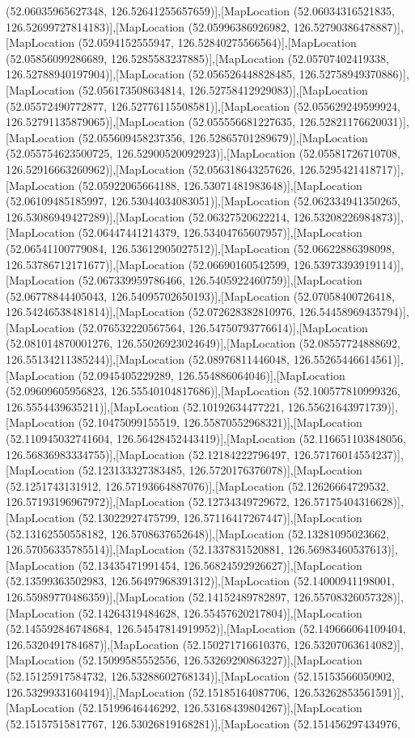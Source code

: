 (52.06035965627348, 126.52641255657659)],[MapLocation (52.06034316521835, 126.52699727814183)],[MapLocation (52.05996386926982, 126.52790386478887)],[MapLocation (52.0594152555947, 126.52840275566564)],[MapLocation (52.05856099286689, 126.5285583237885)],[MapLocation (52.05707402419338, 126.52788940197904)],[MapLocation (52.056526448828485, 126.52758949370886)],[MapLocation (52.056173508634814, 126.52758412929083)],[MapLocation (52.05572490772877, 126.52776115508581)],[MapLocation (52.055629249599924, 126.52791135879065)],[MapLocation (52.055556681227635, 126.52821176620031)],[MapLocation (52.055609458237356, 126.52865701289679)],[MapLocation (52.055754623500725, 126.52900520092923)],[MapLocation (52.05581726710708, 126.52916663260962)],[MapLocation (52.056318643257626, 126.5295421418717)],[MapLocation (52.05922065664188, 126.53071481983648)],[MapLocation (52.06109485185997, 126.53044034083051)],[MapLocation (52.062334941350265, 126.53086949427289)],[MapLocation (52.06327520622214, 126.53208226984873)],[MapLocation (52.06447441214379, 126.53404765607957)],[MapLocation (52.06541100779084, 126.53612905027512)],[MapLocation (52.06622886398098, 126.53786712171677)],[MapLocation (52.06690160542599, 126.53973393919114)],[MapLocation (52.067339959786466, 126.5405922460759)],[MapLocation (52.06778844405043, 126.54095702650193)],[MapLocation (52.07058400726418, 126.54246538481814)],[MapLocation (52.072628382810976, 126.54458969435794)],[MapLocation (52.076532220567564, 126.54750793776614)],[MapLocation (52.081014870001276, 126.55026923024649)],[MapLocation (52.08557724888692, 126.55134211385244)],[MapLocation (52.08976811446048, 126.55265446614561)],[MapLocation (52.0945405229289, 126.554886064046)],[MapLocation (52.09609605956823, 126.55540104817686)],[MapLocation (52.100577810999326, 126.5554439635211)],[MapLocation (52.10192634477221, 126.55621643971739)],[MapLocation (52.10475099155519, 126.55870552968321)],[MapLocation (52.110945032741604, 126.56428452443419)],[MapLocation (52.116651103848056, 126.56836983334755)],[MapLocation (52.12184222796497, 126.57176014554237)],[MapLocation (52.123133327383485, 126.5720176376078)],[MapLocation (52.1251743131912, 126.57193664887076)],[MapLocation (52.12626664729532, 126.57193196967972)],[MapLocation (52.12734349729672, 126.57175404316628)],[MapLocation (52.13022927475799, 126.57116417267447)],[MapLocation (52.13162550558182, 126.5708637652648)],[MapLocation (52.13281095023662, 126.57056335785514)],[MapLocation (52.1337831520881, 126.56983460537613)],[MapLocation (52.13435471991454, 126.56824592926627)],[MapLocation (52.13599363502983, 126.56497968391312)],[MapLocation (52.14000941198001, 126.55989770486359)],[MapLocation (52.14152489782897, 126.55708326057328)],[MapLocation (52.14264319484628, 126.55457620217804)],[MapLocation (52.145592846748684, 126.54547814919952)],[MapLocation (52.149666064109404, 126.5320491784687)],[MapLocation (52.150271716610376, 126.53207063614082)],[MapLocation (52.15099585552556, 126.53269290863227)],[MapLocation (52.15125917584732, 126.53288602768134)],[MapLocation (52.15153566050902, 126.53299331604194)],[MapLocation (52.15185164087706, 126.53262853561591)],[MapLocation (52.15199646446292, 126.53168439804267)],[MapLocation (52.15157515817767, 126.53026819168281)],[MapLocation (52.151456297434976, 